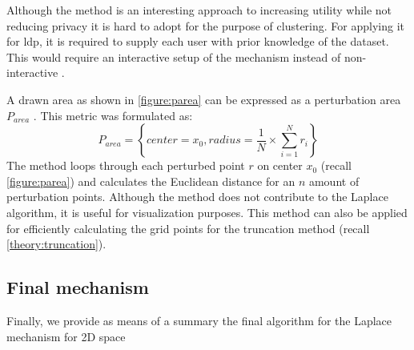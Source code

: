 Although the method is an interesting approach to increasing utility while not reducing privacy it is hard to adopt for the purpose of clustering.
For applying it for \gls{ldp}, it is required to supply each user with prior knowledge of the dataset.
This would require an interactive setup of the mechanism instead of non-interactive . \newline

A drawn area as shown in \ref{figure:parea} can be expressed as a perturbation area $P_{area}$ \citep{yan_perturb_2022}.
This metric was formulated as:
\begin{equation}
  P_{area}=\left\{ center = x_{0},radius = \frac{1}{N}\times \sum _{i=1}^{N}r_{i}\right\}
\end{equation}
The method loops through each perturbed point $r$ on center $x_0$ (recall \ref{figure:parea}) and calculates the Euclidean distance for an $n$ amount of perturbation points.
Although the method does not contribute to the Laplace algorithm, it is useful for visualization purposes.
This method can also be applied for efficiently calculating the grid points for the truncation method (recall \ref{theory:truncation}).
\newpage
\subsection{Final mechanism}
Finally, we provide as means of a summary the final algorithm for the Laplace mechanism for 2D space

\newpage